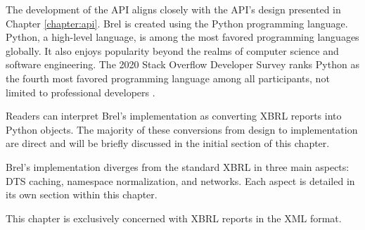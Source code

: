 



The development of the API aligns closely with the API's design presented in Chapter \ref{chapter:api}.
Brel is created using the Python programming language.
Python, a high-level language, is among the most favored programming languages globally.
It also enjoys popularity beyond the realms of computer science and software engineering.
The 2020 Stack Overflow Developer Survey ranks Python as the fourth most favored programming language among all participants, not limited to professional developers \cite{stack_overflow_2020}.

Readers can interpret Brel's implementation as converting XBRL reports into Python objects.
The majority of these conversions from design to implementation are direct and will be briefly discussed in the initial section of this chapter.

Brel's implementation diverges from the standard XBRL in three main aspects: DTS caching, namespace normalization, and networks. Each aspect is detailed in its own section within this chapter.

This chapter is exclusively concerned with XBRL reports in the XML format.
